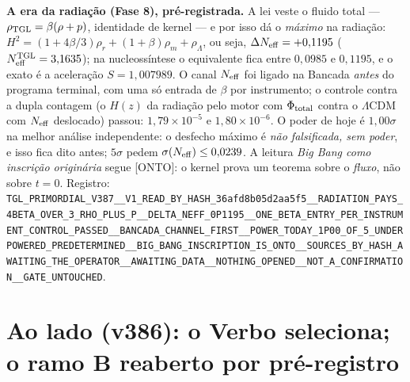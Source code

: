 \documentclass[11pt]{article}
\theoremstyle{definition}\newtheorem{deriv}{Derivação}
\begin{document}
\textbf{A era da radiação (Fase 8), pré-registrada.} A lei veste o fluido total --- $\rho_{\rm TGL}=\beta(\rho+p)$, identidade de kernel --- e por isso dá o \emph{máximo} na radiação: $H^2=(1+4\beta/3)\rho_r+(1+\beta)\rho_m+\rho_\Lambda$, ou seja, $\Delta N_{\rm eff}=+0{,}1195$ ($N_{\rm eff}^{\rm TGL}=3{,}1635$); na nucleossíntese o equivalente fica entre $0{,}0985$ e $0{,}1195$, e o exato é a aceleração $S=1{,}007989$. O canal $N_{\rm eff}$ foi ligado na Bancada \emph{antes} do programa terminal, com uma só entrada de $\beta$ por instrumento; o controle contra a dupla contagem (o $H(z)$ da radiação pelo motor com $\Phi_{\rm total}$ contra o $\Lambda$CDM com $N_{\rm eff}$ deslocado) passou: $1{,}79\times10^{-5}$ e $1{,}80\times10^{-6}$. O poder de hoje é $1{,}00\sigma$ na melhor análise independente: o desfecho máximo é \emph{não falsificada, sem poder}, e isso fica dito antes; $5\sigma$ pedem $\sigma(N_{\rm eff})\le0{,}0239$. A leitura \emph{Big Bang como inscrição originária} segue \textsf{[ONTO]}: o kernel prova um teorema sobre o \emph{fluxo}, não sobre $t=0$. Registro: \texttt{TGL\_\allowbreak{}PRIMORDIAL\_\allowbreak{}V387\_\allowbreak{}\_\allowbreak{}V1\_\allowbreak{}READ\_\allowbreak{}BY\_\allowbreak{}HASH\_\allowbreak{}36afd8b05d2aa5f5\_\allowbreak{}\_\allowbreak{}RADIATION\_\allowbreak{}PAYS\_\allowbreak{}4BETA\_\allowbreak{}OVER\_\allowbreak{}3\_\allowbreak{}RHO\_\allowbreak{}PLUS\_\allowbreak{}P\_\allowbreak{}\_\allowbreak{}DELTA\_\allowbreak{}NEFF\_\allowbreak{}0P1195\_\allowbreak{}\_\allowbreak{}ONE\_\allowbreak{}BETA\_\allowbreak{}ENTRY\_\allowbreak{}PER\_\allowbreak{}INSTRUMENT\_\allowbreak{}CONTROL\_\allowbreak{}PASSED\_\allowbreak{}\_\allowbreak{}BANCADA\_\allowbreak{}CHANNEL\_\allowbreak{}FIRST\_\allowbreak{}\_\allowbreak{}POWER\_\allowbreak{}TODAY\_\allowbreak{}1P00\_\allowbreak{}OF\_\allowbreak{}5\_\allowbreak{}UNDERPOWERED\_\allowbreak{}PREDETERMINED\_\allowbreak{}\_\allowbreak{}BIG\_\allowbreak{}BANG\_\allowbreak{}INSCRIPTION\_\allowbreak{}IS\_\allowbreak{}ONTO\_\allowbreak{}\_\allowbreak{}SOURCES\_\allowbreak{}BY\_\allowbreak{}HASH\_\allowbreak{}AWAITING\_\allowbreak{}THE\_\allowbreak{}OPERATOR\_\allowbreak{}\_\allowbreak{}AWAITING\_\allowbreak{}DATA\_\allowbreak{}\_\allowbreak{}NOTHING\_\allowbreak{}OPENED\_\allowbreak{}\_\allowbreak{}NOT\_\allowbreak{}A\_\allowbreak{}CONFIRMATION\_\allowbreak{}\_\allowbreak{}GATE\_\allowbreak{}UNTOUCHED}.

\section*{Ao lado (v386): o Verbo seleciona; o ramo B reaberto por pré-registro}
\end{document}
